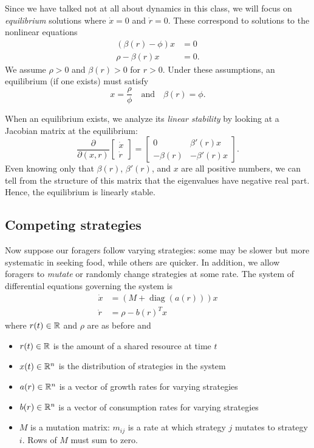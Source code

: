 \documentclass[12pt, leqno]{article} %
\begin{document}
Since we have talked not at all about dynamics in this
class, we will focus on {\em equilibrium} solutions where
$\dot{x} = 0$ and $\dot{r} = 0$.  These correspond to solutions to
the nonlinear equations
\begin{align*}
  (\beta(r)-\phi) x & = 0 \\
  \rho - \beta(r) x & = 0.
\end{align*}
We assume $\rho > 0$ and $\beta(r) > 0$ for $r > 0$.  Under these
assumptions, an equilibrium (if one exists) must satisfy
\[
  x = \frac{\rho}{\phi} \quad \mbox{and} \quad
  \beta(r) = \phi.
\]

When an equilibrium exists, we analyze its {\em linear stability} by
looking at a Jacobian matrix at the equilibrium:
\[
\frac{\partial}{\partial (x,r)}
\begin{bmatrix} \dot{x} \\ \dot{r} \end{bmatrix} =
\begin{bmatrix}
  0 & \beta'(r) x \\
  -\beta(r) & -\beta'(r) x
\end{bmatrix}.
\]
Even knowing only that $\beta(r)$, $\beta'(r)$, and $x$ are all
positive numbers, we can tell from the structure of this matrix that
the eigenvalues have negative real part.  Hence, the equilibrium is
linearly stable.

\subsection{Competing strategies}

Now suppose our foragers follow varying strategies: some may be slower
but more systematic in seeking food, while others are quicker.  In
addition, we allow foragers to {\em mutate} or randomly change
strategies at some rate.  The system of differential equations
governing the system is
\begin{align*}
  \dot{x} &= \left(M + \operatorname{diag}(a(r))\right) x \\
  \dot{r} &= \rho - b(r)^T x
\end{align*}
where $r(t) \in \mathbb{R}$ and $\rho$ are as before and
\begin{itemize}
\item $r(t) \in \mathbb{R}$ is the amount of a shared resource at time $t$
\item $x(t) \in \mathbb{R}^n$ is the distribution of strategies in the system
\item $a(r) \in \mathbb{R}^n$ is a vector of growth rates for varying
  strategies
\item $b(r) \in \mathbb{R}^n$ is a vector of consumption rates for varying strategies
\item $M$ is a mutation matrix: $m_{ij}$ is a rate at which strategy
  $j$ mutates to strategy $i$.  Rows of $M$ must sum to zero.
\end{itemize}
\end{document}
